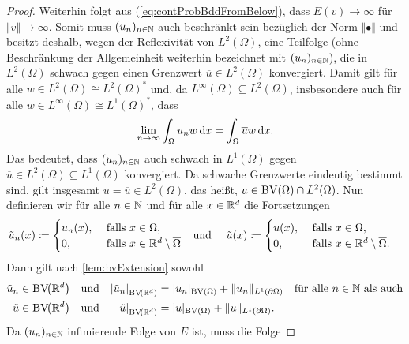 \begin{proof}
  Weiterhin folgt aus (\ref{eq:contProbBddFromBelow}), dass
  $E(v)\rightarrow\infty$ für $\Vert v\Vert\rightarrow\infty$. 
  Somit muss $(u_n)_{n\in\mathbb{N}}$ auch beschränkt sein bezüglich der Norm
  $\Vert\bullet\Vert$ und besitzt deshalb, wegen der Reflexivität von
  $L^2(\Omega)$, eine Teilfolge (ohne Beschränkung der Allgemeinheit weiterhin
  bezeichnet mit $(u_n)_{n\in\mathbb{N}}$), die in $L^2(\Omega)$ schwach gegen einen
  Grenzwert $\overline{u}\in L^2(\Omega)$ konvergiert. 
  Damit gilt für alle $w\in L^2(\Omega)\cong L^2(\Omega)^\ast$ und, da
  $L^\infty(\Omega)\subseteq L^2(\Omega)$, insbesondere auch für alle $w\in
  L^\infty(\Omega)\cong L^1(\Omega)^\ast$, dass 
  \begin{align*}
    \lim_{n\to\infty}\int_\Omega u_n w\,\mathrm{d}x =\int_\Omega \overline{u} w\,\mathrm{d}x.
  \end{align*}
  Das bedeutet, dass $(u_n)_{n\in\mathbb{N}}$ auch schwach in $L^1(\Omega)$ gegen
  $\overline{u}\in L^2(\Omega)\subseteq L^1(\Omega)$ konvergiert. 
  Da schwache Grenzwerte eindeutig bestimmt sind, gilt insgesamt $u=\overline u
  \in L^2(\Omega)$, das heißt, $u\in\textup{BV}(\Omega)\cap L^2(\Omega)$.
  Nun definieren wir für alle
  $n\in\mathbb{N}$ und für alle 
  $x\in\mathbb{R}^d$ die Fortsetzungen
  \begin{align*}
    \tilde{u}_n(x)
    &\coloneqq
    \begin{cases}
      u_n(x),  &\text{ falls } x\in\Omega,\\
      0,     &\text{ falls } x\in\mathbb{R}^d\setminus\overline\Omega
    \end{cases} 
    &&\text{und }
    &\tilde{u}(x)
    &\coloneqq
    \begin{cases}
      u(x),  &\text{ falls } x\in\Omega,\\
      0,     &\text{ falls } x\in\mathbb{R}^d\setminus\overline\Omega.
    \end{cases} 
  \end{align*}
  Dann gilt nach \cref{lem:bvExtension} sowohl
  \begin{align*}
    \tilde{u}_n
    &\in
    \textup{BV}\!\big(\mathbb{R}^d\big)
    &&\text{und}
    &\left|\tilde{u}_n\right|_{\textup{BV}\!\left(\mathbb{R}^d\right)} 
    &= 
    |u_n|_{\textup{BV}(\Omega)}+\Vert u_n\Vert_{L^1(\partial\Omega)}
    \quad\text{für alle }n\in\mathbb{N} \text{ als auch}\\
    \tilde{u}
    &\in
    \textup{BV}\!\big(\mathbb{R}^d\big)
    &&\text{und}
    &\left|\tilde{u}\right|_{\textup{BV}\!\left(\mathbb{R}^d\right)} 
    &=
    |u|_{\textup{BV}(\Omega)}+\Vert u\Vert_{L^1(\partial\Omega)}.
  \end{align*}
  Da $(u_n)_{n\in \mathbb{N}}$ infimierende Folge von $E$ ist, muss die Folge

\end{proof}
